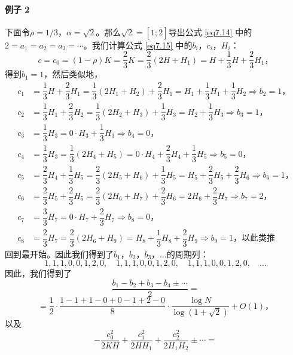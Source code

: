 \documentclass[11pt,a4paper]{article}
\theoremstyle{definition}
\newcommand{\refeq}[1]{公式 \ref{#1}}
\numberwithin{equation}{section}
\newcommand{\comma}{\text{，}}
\newcommand{\periodrep}[3]{$ \sqrt{#1}=\left[#2;\overline{#3}\right] $}
\newcommand{\erfenzy}{\dfrac{1}{2}}
\begin{document}
\paragraph{例子 2} 下面令$ \rho=1/3\comma\alpha=\sqrt{2} $。那么\periodrep{2}{1}{2}导出\refeq{eq7.14} 中的$ 2=a_{1}=a_{2}=a_{3}=\cdots $。我们计算\refeq{eq7.15} 中的$ b_{i}\comma c_{i}\comma H_{i} $：
 \[ c=c_{0}=\left(1-\rho\right)K=\dfrac{2}{3}K=\dfrac{2}{3}\left(2H+H_{1}\right)=H+\dfrac{1}{3}H+\dfrac{2}{3}H_{1}\comma \]
 得到$ b_{1}=1 $，然后类似地，
 \begin{equation*}
 	\begin{split}
 	c_{1}&=\dfrac{1}{3}H+\dfrac{2}{3}H_{1}=\dfrac{1}{3}\left(2H_{1}+H_{2}\right)+\dfrac{2}{3}H_{1}=H_{1}+\dfrac{1}{3}H_{1}+\dfrac{1}{3}H_{2} \Rightarrow b_{2}=1\comma
 	\\	c_{2}&=\dfrac{1}{3}H_{1}+\dfrac{2}{3}H_{2}=\dfrac{1}{3}\left(2H_{2}+H_{3}\right)+\dfrac{1}{3}H_{3}=H_{2}+\dfrac{1}{3}H_{3} \Rightarrow b_{3}=1\comma
   	\\	c_{3}&=\dfrac{1}{3}H_{3}=0\cdot H_{3}+\dfrac{1}{3}H_{3} \Rightarrow b_{4}=0\comma
	\\	c_{4}&=\dfrac{1}{3}H_{3}=\dfrac{1}{3}\left(2H_{4}+H_{5}\right)=0\cdot H_{4}+\dfrac{2}{3}H_{4}+\dfrac{1}{3}H_{5} \Rightarrow b_{5}=0\comma
	\\	c_{5}&=\dfrac{2}{3}H_{4}+\dfrac{1}{3}H_{5}=\dfrac{2}{3}\left(2H_{5}+H_{6}\right)+\dfrac{1}{3}H_{5}=H_{5}+\dfrac{2}{3}H_{5}+\dfrac{2}{3}H_{6} \Rightarrow b_{6}=1\comma
	\\	c_{6}&=\dfrac{2}{3}H_{5}+\dfrac{2}{3}H_{5}=\dfrac{2}{3}\left(2H_{6}+H_{7}\right)+\dfrac{2}{3}H_{6}=2H_{6}+\dfrac{2}{3}H_{7} \Rightarrow b_{7}=2\comma
	\\	
	c_{7}&=\dfrac{3}{3}H_{7}=0\cdot H_{7}+\dfrac{2}{3}H_{7} \Rightarrow b_{8}=0\comma
	\\	c_{8}&=\dfrac{2}{3}H_{7}=\dfrac{2}{3}\left(2H_{6}+H_{9}\right)=H_{8}+\dfrac{1}{3}H_{8}+\dfrac{2}{3}H_{9} \Rightarrow b_{9}=1\comma\text{以此类推}
 	\end{split}
 \end{equation*}
 回到最开始。因此我们得到了$ b_{1}\comma b_{2}\comma b_{3}\comma\ldots$的周期列：
 \[ 1,1,1,0,0,1,2,0,\quad1,1,1,0,0,1,2,0,\quad1,1,1,0,0,1,2,0,\quad\ldots \]
 因此，我们得到了
 \[ \dfrac{b_{1}- b_{2}+b_{3}-b_{4}\pm\cdots}{2}= \]
 \begin{equation}\label{eq7.32}
 =\erfenzy\cdot\dfrac{1-1+1-0+0-1+2-0}{8}\cdot\dfrac{\log N}{\log(1+\sqrt{2})}+O(1)\comma
 \end{equation}
 以及
 \[ -\dfrac{c_{0}^{2}}{2KH}+\dfrac{c_{1}^{2}}{2HH_{1}}+\dfrac{c_{2}^{2}}{2H_{1}H_{2}}\pm\cdots= \]
\end{document}
